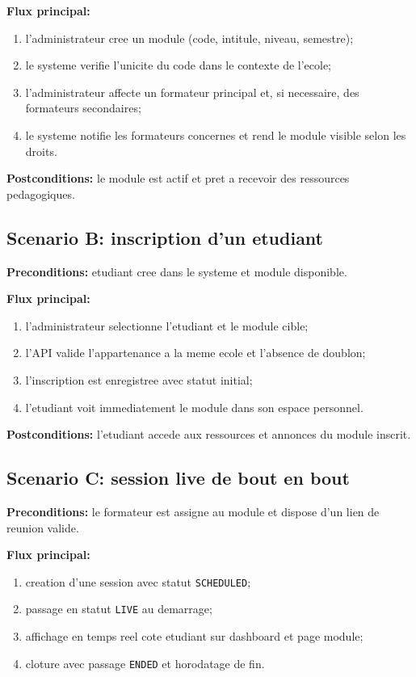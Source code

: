 ﻿\documentclass[12pt,a4paper,oneside]{report}
\begin{document}
\textbf{Flux principal:}
\begin{enumerate}
  \item l'administrateur cree un module (code, intitule, niveau, semestre);
  \item le systeme verifie l'unicite du code dans le contexte de l'ecole;
  \item l'administrateur affecte un formateur principal et, si necessaire, des formateurs secondaires;
  \item le systeme notifie les formateurs concernes et rend le module visible selon les droits.
\end{enumerate}

\textbf{Postconditions:} le module est actif et pret a recevoir des ressources pedagogiques.

\subsection{Scenario B: inscription d'un etudiant}

\textbf{Preconditions:} etudiant cree dans le systeme et module disponible.

\textbf{Flux principal:}
\begin{enumerate}
  \item l'administrateur selectionne l'etudiant et le module cible;
  \item l'API valide l'appartenance a la meme ecole et l'absence de doublon;
  \item l'inscription est enregistree avec statut initial;
  \item l'etudiant voit immediatement le module dans son espace personnel.
\end{enumerate}

\textbf{Postconditions:} l'etudiant accede aux ressources et annonces du module inscrit.

\subsection{Scenario C: session live de bout en bout}

\textbf{Preconditions:} le formateur est assigne au module et dispose d'un lien de reunion valide.

\textbf{Flux principal:}
\begin{enumerate}
  \item creation d'une session avec statut \texttt{SCHEDULED};
  \item passage en statut \texttt{LIVE} au demarrage;
  \item affichage en temps reel cote etudiant sur dashboard et page module;
  \item cloture avec passage \texttt{ENDED} et horodatage de fin.
\end{enumerate}
\end{document}
